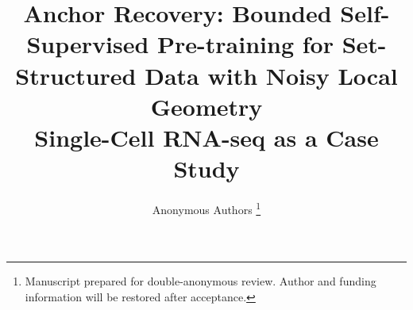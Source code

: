 \documentclass[sigconf,nonacm,review,anonymous]{acmart}
\title{Anchor Recovery: Bounded Self-Supervised Pre-training for Set-Structured Data with Noisy Local Geometry\\
\large Single-Cell RNA-seq as a Case Study}
\author{Anonymous Authors%
\thanks{Manuscript prepared for double-anonymous review. Author and funding information will be restored after acceptance.}}
\begin{document}
\begin{abstract}

\end{abstract}

\maketitle                   %

\makeatletter
\setlength{\@fptop}{0pt}
\setlength{\@fpsep}{12pt}
\makeatother
\setlength{\topfraction}{0.95}
\setlength{\floatpagefraction}{0.80}

\frenchspacing               %












\balance




\end{document}

